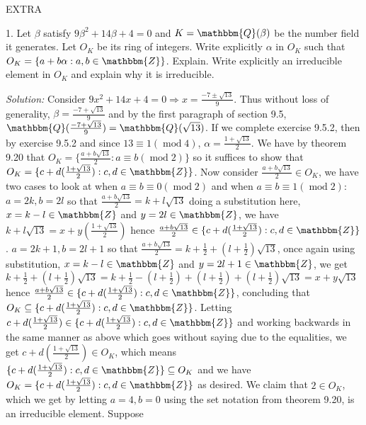 \documentclass{letter}
\newcommand{\tmem}[1]{{\em #1\/}}
\newcommand{\tmop}[1]{\ensuremath{\operatorname{#1}}}
\begin{document}
EXTRA

1. Let $\beta$ satisfy $9 \beta^2 + 14 \beta + 4 = 0$ and $K
=\mathbbm{Q}(\beta)$ be the number field it generates. Let $O_K$ be its ring
of integers. Write explicitly $\alpha$ in $O_K$ such that $O_K =\{a + b \alpha
: a, b \in \mathbbm{Z}\}$. Explain. Write explicitly an irreducible element in
$O_K$ and explain why it is irreducible.

{\tmem{Solution:}} Consider $9 x^2 + 14 x + 4 = 0 \Rightarrow x = \frac{- 7
\pm \sqrt{13}}{9}$. Thus without loss of generality, $\beta = \frac{- 7 +
\sqrt{13}}{9}$ and by the first paragraph of section 9.5, $\mathbbm{Q}(
\frac{- 7 + \sqrt{13}}{9}) =\mathbbm{Q}( \sqrt{13})$. If we complete exercise
9.5.2, then by exercise 9.5.2 and since $13 \equiv 1 (\tmop{mod} 4)$, $\alpha
= \frac{1 + \sqrt{13}}{2}$. We have by theorem 9.20 that $O_K =\{ \frac{a + b
\sqrt{13}}{2} : a \equiv b (\tmop{mod} 2)\}$ so it suffices to show that $O_K
=\{c + d ( \frac{1 + \sqrt{13}}{2}) : c, d \in \mathbbm{Z}\}$. Now consider
$\frac{a + b \sqrt{13}}{2} \in O_K$, we have two cases to look at when $a
\equiv b \equiv 0 (\tmop{mod} 2)$ and when $a \equiv b \equiv 1 (\tmop{mod}
2)$: $a = 2 k, b = 2 l$ so that $\frac{a + b \sqrt{13}}{2} = k + l \sqrt{13}$
doing a substitution here, $x = k - l \in \mathbbm{Z}$ and $y = 2 l \in
\mathbbm{Z}$, we have $k + l \sqrt{13} = x + y ( \frac{1 + \sqrt{13}}{2})$
hence $\frac{a + b \sqrt{13}}{2} \in \{c + d ( \frac{1 + \sqrt{13}}{2}) : c, d
\in \mathbbm{Z}\}$. $a = 2 k + 1, b = 2 l + 1$ so that $\frac{a + b
\sqrt{13}}{2} = k + \frac{1}{2} + (l + \frac{1}{2}) \sqrt{13}$, once again
using substitution, $x = k - l \in \mathbbm{Z}$ and $y = 2 l + 1 \in
\mathbbm{Z}$, we get $k + \frac{1}{2} + (l + \frac{1}{2}) \sqrt{13} = k +
\frac{1}{2} - (l + \frac{1}{2}) + (l + \frac{1}{2}) + (l + \frac{1}{2})
\sqrt{13} = x + y \sqrt{13}$ hence $\frac{a + b \sqrt{13}}{2} \in \{c + d (
\frac{1 + \sqrt{13}}{2}) : c, d \in \mathbbm{Z}\}$, concluding that $O_K
\subseteq \{c + d ( \frac{1 + \sqrt{13}}{2}) : c, d \in \mathbbm{Z}\}$.
Letting $c + d ( \frac{1 + \sqrt{13}}{2}) \in \{c + d ( \frac{1 +
\sqrt{13}}{2}) : c, d \in \mathbbm{Z}\}$ and working backwards in the same
manner as above which goes without saying due to the equalities, we get $c + d
( \frac{1 + \sqrt{13}}{2}) \in O_K$, which means $\{c + d ( \frac{1 +
\sqrt{13}}{2}) : c, d \in \mathbbm{Z}\} \subseteq O_K$ and we have $O_K =
\text{$\{c + d ( \frac{1 + \sqrt{13}}{2}) : c, d \in \mathbbm{Z}\}$}$ as
desired. We claim that $2 \in O_K$, which we get by letting $a = 4, b = 0$
using the set notation from theorem 9.20, is an irreducible element. Suppose
\end{document}

